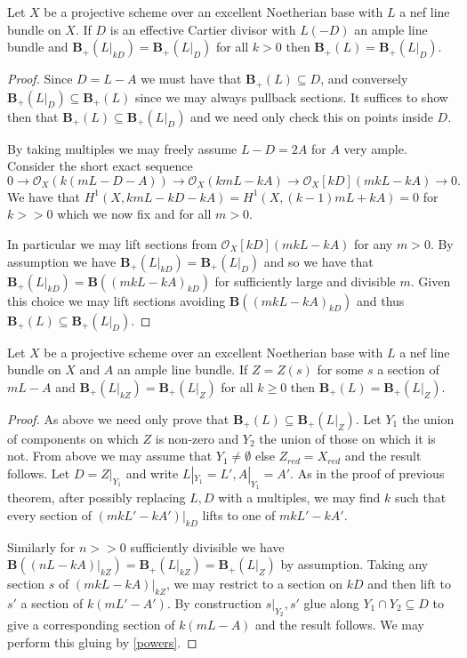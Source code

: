 \documentclass[a4paper,12pt]{book}
\newcommand{\BB}{\mathbf{B}}
\newcommand{\BS}{\mathbf{B}_{+}}
\newcommand{\ox}{\mathcal{O}_{X}}
\begin{document}
\begin{lemma}
	Let $X$ be a projective scheme over an excellent Noetherian base with $L$ a nef line bundle on $X$. If $D$ is an effective Cartier divisor with $L(-D)$ an ample line bundle and $\BS(L|_{kD})=\BS(L|_{D})$ for all $k > 0$ then $\BS(L)=\BS(L|_{D})$.
\end{lemma}

\begin{proof}
	Since $D=L-A$ we must have that $\BS(L) \subseteq D$, and conversely $\BS(L|_{D}) \subseteq \BS(L)$ since we may always pullback sections. It suffices to show then that $\BS(L) \subseteq \BS(L|_{D})$ and we need only check this on points inside $D$.
	
	By taking multiples we may freely assume $L-D=2A$ for $A$ very ample. Consider the short exact sequence
	\[0 \to \ox(k(mL-D-A))\to \ox(kmL-kA) \to \ox[kD](mkL-kA) \to 0.\]
	We have that $H^{1}(X,kmL-kD-kA)=H^{1}(X,(k-1)mL+kA)=0$ for $k >>0$ which we now fix and for all $m >0$.
	
	In particular we may lift sections from $\ox[kD](mkL-kA)$ for any $m>0$. By assumption we have $\BS(L|_{kD})=\BS(L|_{D})$ and so we have that $\BS(L|_{kD})=\BB((mkL-kA)_{kD})$ for sufficiently large and divisible $m$. Given this choice we may lift sections avoiding $\BB((mkL-kA)_{kD})$ and thus $\BS(L) \subseteq \BS(L|_{D})$.
\end{proof}

\begin{lemma}\label{reduce}
	Let $X$ be a projective scheme over an excellent Noetherian base with $L$ a nef line bundle on $X$ and $A$ an ample line bundle. If $Z=Z(s)$ for some $s$ a section of $mL-A$ and $\BS(L|_{kZ})=\BS(L|_{Z})$ for all $k \geq 0$ then $\BS(L)=\BS(L|_{Z})$.
\end{lemma}

\begin{proof}
	As above we need only prove that $\BS(L)\subseteq \BS(L|_{Z})$.	Let $Y_{1}$ the union of components on which $Z$ is non-zero and $Y_{2}$ the union of those on which it is not. From above we may assume that $Y_{1} \neq \emptyset$ else $Z_{red}=X_{red}$ and the result follows. Let $D=Z|_{Y_{1}}$ and write $L|_{Y_{1}}=L', A|_{Y_{1}}=A'$. As in the proof of previous theorem, after possibly replacing $L,D$ with a multiples, we may find $k$ such that every section of $(mkL'-kA')|_{kD}$ lifts to one of $mkL'-kA'$. 
	
	Similarly for $n>>0$ sufficiently divisible we have $\mathbf{B}((nL-kA)|_{kZ})=\BS(L|_{kZ})=\BS(L|_{Z})$ by assumption. Taking any section $s$ of $(mkL-kA)|_{kZ}$, we may restrict to a section on $kD$ and then lift to $s'$ a section of $k(mL'-A')$. By construction $s|_{Y_{2}},s'$ glue along $Y_{1}\cap Y_{2}\subseteq D$ to give a corresponding section of $k(mL-A)$ and the result follows. We may perform this gluing by \autoref{powers}.
\end{proof}
\end{document}
